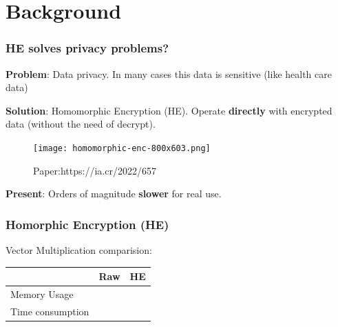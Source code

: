 \documentclass[10pt,handout]{beamer}
\begin{document}
\section{Background}
\begin{frame}
    \frametitle{HE solves privacy problems?}


        \textbf{Problem}: Data privacy. In many cases this data is sensitive (like health care data)
    \vspace{-0.3cm}


\pause
          \textbf{Solution}: Homomorphic Encryption (HE). Operate \textbf{directly} with encrypted data (without the need of decrypt).
          \pause
    \begin{figure}
        \texttt{[image: homomorphic-enc-800x603.png]}
        \caption{Paper:https://ia.cr/2022/657}
    \end{figure}
\pause
\pause
    \vspace{-0.2cm}
    \textbf{Present}: Orders of magnitude \textbf{slower} for real use.
\end{frame}
\begin{frame}

    \frametitle{Homorphic Encryption (HE)}

    Vector Multiplication comparision:
    \begin{table}[]
        \begin{tabular}{|l|l|l|}
            \hline
                             & Raw & HE \\ \hline
            Memory Usage     &   &    \\ \hline
            Time consumption &     &    \\ \hline
        \end{tabular}
    \end{table}
\end{frame}
\end{document}
